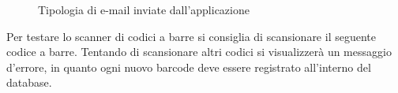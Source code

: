 \documentclass[12pt, a4paper, titlepage]{report}
\begin{document}
	\begin{figure}[H] 
		\centering
		\hspace*{2cm}
		\caption{Tipologia di e-mail inviate dall'applicazione}
		\label{fig:mail}
	\end{figure}
	
	\noindent Per testare lo scanner di codici a barre si consiglia di scansionare il seguente codice a barre. Tentando di scansionare altri codici si visualizzerà un messaggio d'errore, in quanto ogni nuovo barcode deve essere registrato all'interno del database.
	
\end{document}
